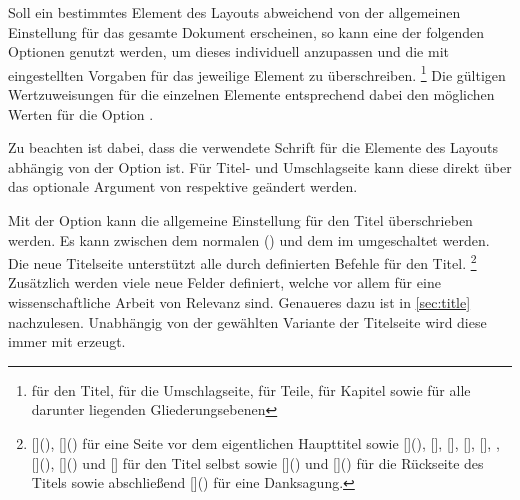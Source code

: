 \begin{Declaration*}{}
\begin{Declaration*}{}
\begin{Declaration*}{}
Soll ein bestimmtes Element des Layouts abweichend von der allgemeinen 
Einstellung für das gesamte Dokument erscheinen, so kann eine der folgenden 
Optionen genutzt werden, um dieses individuell anzupassen und die mit 
 eingestellten Vorgaben für das jeweilige Element zu 
überschreiben.%
\footnote{%
   für den Titel,  für die Umschlagseite,
   für Teile,  für Kapitel sowie
   für alle darunter liegenden Gliederungsebenen%
}
Die gültigen Wertzuweisungen für die einzelnen Elemente entsprechend dabei den 
möglichen Werten für die Option . 

Zu beachten ist dabei, dass die verwendete Schrift für die Elemente des Layouts 
abhängig von der Option  ist. Für Titel- und Umschlagseite 
kann diese direkt über das optionale Argument von  respektive 
 geändert werden.

\begin{Declaration}[%
  v2.03!\Option{cdtitle=bicolor}:%
    Farbeinsatz nur im Kopf mit farbig abgesetztem Querbalken;
  v2.03!\Option{cdtitle=fullcolor}:%
    voller Farbeinsatz mit farbig abgesetztem Querbalken;
  v2.04!\Option{cdtitle=barcolor}:nur farbig abgesetzter Querbalken;%
]{}
\printdeclarationlist%
%
%
Mit der Option  kann die allgemeine Einstellung für den Titel 
überschrieben werden. Es kann zwischen dem normalen () 
und dem im \CD umgeschaltet werden. Die neue Titelseite unterstützt alle durch 
\KOMAScript{} definierten Befehle für den Titel.%
\footnote{%
  [](),
  []() für eine 
  Seite vor dem eigentlichen Haupttitel sowie
  [](),
  [], [],
  [], [],
  , [](), 
  []() und 
  [] für den Titel selbst sowie 
  []()
  und
  []() 
  für die Rückseite des Titels sowie abschließend 
  []() für eine 
  Danksagung.
}
Zusätzlich werden viele neue Felder definiert, welche vor allem für eine 
wissenschaftliche Arbeit von Relevanz sind. Genaueres dazu 
ist in \autoref{sec:title} nachzulesen. Unabhängig von der gewählten Variante 
der Titelseite wird diese immer mit  erzeugt.
\end{Declaration}


\end{Declaration*}
\end{Declaration*}
\end{Declaration*}
